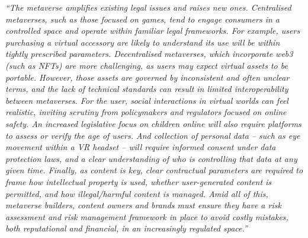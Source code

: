 \textit{``The metaverse amplifies existing legal issues and raises new ones. Centralised metaverses, such as those focused on games, tend to engage consumers in a controlled space and operate within familiar legal frameworks. For example, users purchasing a virtual accessory are likely to understand its use will be within tightly prescribed
parameters. Decentralised metaverses, which incorporate web3 (such as NFTs) are more challenging, as users may expect virtual assets to be portable. However, those assets are governed by inconsistent and often unclear terms, and the lack of technical standards can result in limited interoperability between metaverses. For the user, social interactions in virtual worlds can feel realistic, inviting scrutiny from policymakers and regulators focused on online
safety. An increased legislative focus on children online will also require platforms to assess or verify the age of users. And collection of personal data – such as eye movement within a VR headset – will require informed consent under data protection laws, and a clear understanding of who is controlling that data at any given time.
Finally, as content is key, clear contractual parameters are required to frame how intellectual property is used, whether user-generated content is permitted, and how illegal/harmful content is managed.
Amid all of this, metaverse builders, content owners and brands must ensure they have a risk assessment and risk management framework
in place to avoid costly mistakes, both reputational and financial, in an increasingly regulated space.''}\par

